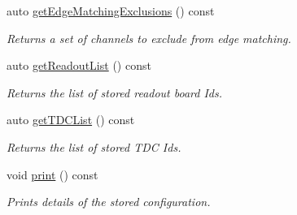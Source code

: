 \begin{DoxyCompactItemize}
auto \hyperlink{class_config_a52e4f9cf94eb242fd536a6cde42088a8}{get\+Edge\+Matching\+Exclusions} () const
\begin{DoxyCompactList}\small\item\em Returns a set of channels to exclude from edge matching. \end{DoxyCompactList}\item 
auto \hyperlink{class_config_a2132b60dfeadd7627f2b91eeca972be6}{get\+Readout\+List} () const
\begin{DoxyCompactList}\small\item\em Returns the list of stored readout board Ids. \end{DoxyCompactList}\item 
auto \hyperlink{class_config_a5abca15acd221de16fc625e7ed5dbb64}{get\+T\+D\+C\+List} () const
\begin{DoxyCompactList}\small\item\em Returns the list of stored T\+DC Ids. \end{DoxyCompactList}\item 
void \hyperlink{class_config_af75cb5a60c6cac9d6f6d030e65a5240a}{print} () const
\begin{DoxyCompactList}\small\item\em Prints details of the stored configuration. \end{DoxyCompactList}\end{DoxyCompactItemize}
